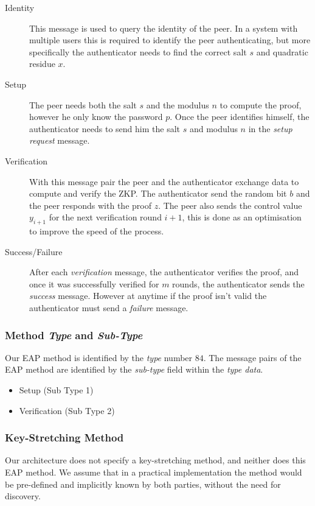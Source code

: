 \newpage
\begin{description}
	\item [Identity] This message is used to query the identity of the peer. In a system with multiple users this is required to identify the peer authenticating, but more specifically the authenticator needs to find the correct salt $s$ and quadratic residue $x$. 
	\item [Setup] The peer needs both the salt $s$ and the modulus $n$ to compute the proof, however he only know the password $p$. Once the peer identifies himself, the authenticator needs to send him the salt $s$ and modulus $n$ in the \textit{setup request} message.
	\item [Verification] With this message pair the peer and the authenticator exchange data to compute and verify the ZKP. The authenticator send the random bit $b$ and the peer responds with the proof $z$. The peer also sends the control value $y_{i+1}$ for the next verification round $i+1$, this is done as an optimisation to improve the speed of the process.
	\item [Success/Failure] After each \textit{verification} message, the authenticator verifies the proof, and once it was successfully verified for $m$ rounds, the authenticator sends the \textit{success} message. However at anytime if the proof isn't valid the authenticator must send a \textit{failure} message.
\end{description}

\subsubsection{Method \textit{Type} and \textit{Sub-Type}}
Our EAP method is identified by the \textit{type} number $84$.
The message pairs of the EAP method are identified by the \textit{sub-type} field within the \textit{type data}.
\begin{itemize}
	\item Setup (Sub Type 1)
	\item Verification (Sub Type 2)
\end{itemize}

\subsubsection{Key-Stretching Method}
Our architecture does not specify a key-stretching method, and neither does this EAP method.
We assume that in a practical implementation the method would be pre-defined and implicitly known by both parties, without the need for discovery.

